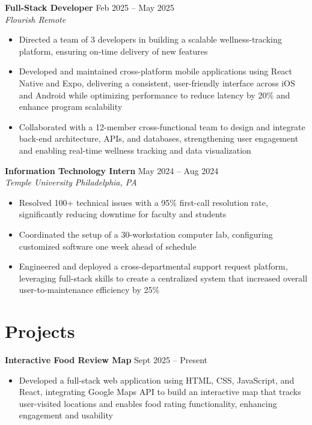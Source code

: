 \documentclass[letterpaper,11pt]{article}
\begin{document}
\normalsize{\textbf{Full-Stack Developer} \hfill Feb 2025 -- May 2025} \\
\footnotesize{\textit{Flourish \hfill Remote}}
\vspace{-5pt}
\begin{itemize}
  \item Directed a team of 3 developers in building a scalable wellness-tracking platform, ensuring on-time delivery of new features
  \item Developed and maintained cross-platform mobile applications using React Native and Expo, delivering a consistent, user-friendly interface across iOS and Android while optimizing performance to reduce latency by 20\% and enhance program scalability
  \item Collaborated with a 12-member cross-functional team to design and integrate back-end architecture, APIs, and databases, strengthening user engagement and enabling real-time wellness tracking and data visualization
\end{itemize}

\normalsize{\textbf{Information Technology Intern} \hfill May 2024 -- Aug 2024} \\
\footnotesize{\textit{Temple University \hfill Philadelphia, PA}}
\vspace{-5pt}
\begin{itemize}
  \item Resolved 100+ technical issues with a 95\% first-call resolution rate, significantly reducing downtime for faculty and students
  \item Coordinated the setup of a 30-workstation computer lab, configuring customized software one week ahead of schedule
  \item Engineered and deployed a cross-departmental support request platform, leveraging full-stack skills to create a centralized system that increased overall user-to-maintenance efficiency by 25\%
\end{itemize}
\vspace{-7pt}
\section{Projects}
\normalsize{\textbf{Interactive Food Review Map}} \hfill Sept 2025 -- Present
\vspace{-5pt}
\begin{itemize}
  \item Developed a full-stack web application using HTML, CSS, JavaScript, and React, integrating Google Maps API to build an interactive map that tracks user-visited locations and enables food rating functionality, enhancing engagement and usability
\end{itemize}
\end{document}
